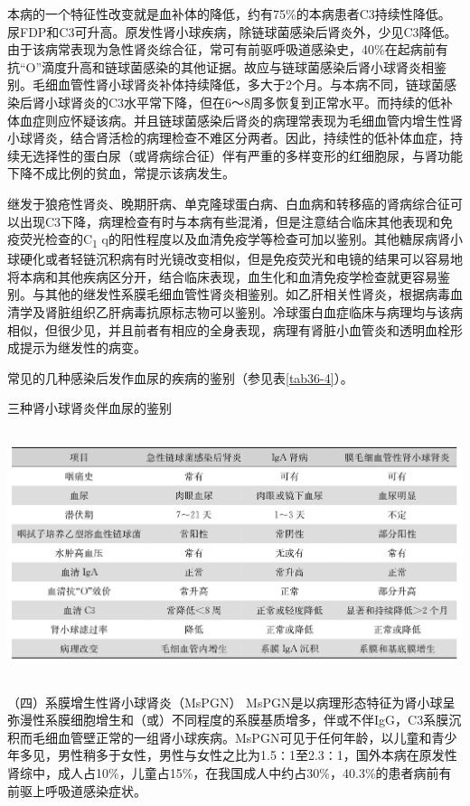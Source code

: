 本病的一个特征性改变就是血补体的降低，约有75\%的本病患者C3持续性降低。尿FDP和C3可升高。原发性肾小球疾病，除链球菌感染后肾炎外，少见C3降低。由于该病常表现为急性肾炎综合征，常可有前驱呼吸道感染史，40\%在起病前有抗“O”滴度升高和链球菌感染的其他证据。故应与链球菌感染后肾小球肾炎相鉴别。毛细血管性肾小球肾炎补体持续降低，多大于2个月。与本病不同，链球菌感染后肾小球肾炎的C3水平常下降，但在6～8周多恢复到正常水平。而持续的低补体血症则应怀疑该病。并且链球菌感染后肾炎的病理常表现为毛细血管内增生性肾小球肾炎，结合肾活检的病理检查不难区分两者。因此，持续性的低补体血症，持续无选择性的蛋白尿（或肾病综合征）伴有严重的多样变形的红细胞尿，与肾功能下降不成比例的贫血，常提示该病发生。

继发于狼疮性肾炎、晚期肝病、单克隆球蛋白病、白血病和转移癌的肾病综合征可以出现C3下降，病理检查有时与本病有些混淆，但是注意结合临床其他表现和免疫荧光检查的C\textsubscript{1}
q的阳性程度以及血清免疫学等检查可加以鉴别。其他糖尿病肾小球硬化或者轻链沉积病有时光镜改变相似，但是免疫荧光和电镜的结果可以容易地将本病和其他疾病区分开，结合临床表现，血生化和血清免疫学检查就更容易鉴别。与其他的继发性系膜毛细血管性肾炎相鉴别。如乙肝相关性肾炎，根据病毒血清学及肾脏组织乙肝病毒抗原标志物可以鉴别。冷球蛋白血症临床与病理均与该病相似，但很少见，并且前者有相应的全身表现，病理有肾脏小血管炎和透明血栓形成提示为继发性的病变。

常见的几种感染后发作血尿的疾病的鉴别（参见表\ref{tab36-4}）。

\begin{table}[htbp]
\centering
\caption{三种肾小球肾炎伴血尿的鉴别}
\label{tab36-4}
\includegraphics[width=5.95833in,height=2.84375in]{./images/Image00227.jpg}
\end{table}

（四）系膜增生性肾小球肾炎（MsPGN）
MsPGN是以病理形态特征为肾小球呈弥漫性系膜细胞增生和（或）不同程度的系膜基质增多，伴或不伴IgG，C3系膜沉积而毛细血管壁正常的一组肾小球疾病。MsPGN可见于任何年龄，以儿童和青少年多见，男性稍多于女性，男性与女性之比为1.5∶1至2.3∶1，国外本病在原发性肾综中，成人占10\%，儿童占15\%，在我国成人中约占30\%，40.3\%的患者病前有前驱上呼吸道感染症状。

